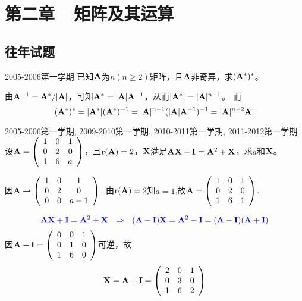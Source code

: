 \section{第二章~~矩阵及其运算}

\subsection{往年试题}
\begin{frame}
\begin{footnotesize}
\begin{exampleblock}{2005-2006第一学期}
已知$\mathbf{A}$为$n(n\ge 2)$矩阵，且$\mathbf{A}$非奇异，求$(\mathbf{A}^*)^*$。
\end{exampleblock}
\pause\jiename
由$\mathbf{A}^{-1}=\mathbf{A}^*/|\mathbf{A}|$，可知$\mathbf{A}^*=|\mathbf{A}|\mathbf{A}^{-1}$，从而$|\mathbf{A}^*|=|\mathbf{A}|^{n-1}$。
而
$$
(\mathbf{A}^*)^*=|\mathbf{A}^*|(\mathbf{A}^*)^{-1}=|\mathbf{A}|^{n-1}(|\mathbf{A}|\mathbf{A}^{-1})^{-1}=|\mathbf{A}|^{n-2}\mathbf{A}.
$$
\end{footnotesize}
\end{frame}

\begin{frame}
\begin{footnotesize}
\begin{exampleblock}{2005-2006第一学期, 2009-2010第一学期, 2010-2011第一学期, 2011-2012第一学期}
设$\mathbf{A}=\left(
\begin{array}{rrr}
1&0&1\\
0&2&0\\
1&6&a
\end{array}
\right)$，且$\mathrm{r}(\mathbf{A})=2$，$\mathbf{X}$满足$\mathbf{A}\mathbf{X}+\mathbf{I}=\mathbf{A}^2+\mathbf{X}$，求$a$和$\mathbf{X}$。
\end{exampleblock}
\pause\jiename
因$\mathbf{A} \rightarrow \left(
\begin{array}{ccc}
1&0&1\\
0&2&0\\
0&0&a-1
\end{array}
\right)$,
由$\mathrm{r}(\mathbf{A})=2$知$a=1$,故$\mathbf{A}=\left(
\begin{array}{rrr}
1&0&1\\
0&2&0\\
1&6&1
\end{array}
\right)$.
\vspace{0.1in}


$$\textcolor{blue}{
\mathbf{A}\mathbf{X}+\mathbf{I}=\mathbf{A}^2+\mathbf{X} ~~\Rightarrow~~
(\mathbf{A}-\mathbf{I})\mathbf{X}=\mathbf{A}^2-\mathbf{I}=(\mathbf{A}-\mathbf{I})(\mathbf{A}+\mathbf{I})
}
$$
因$
\mathbf{A}-\mathbf{I}=\left(
\begin{array}{rrr}
0&0&1\\
0&1&0\\
1&6&0
\end{array}
\right)
$可逆，故
$$
\mathbf{X}=\mathbf{A}+\mathbf{I}=\left(
\begin{array}{rrr}
2&0&1\\
0&3&0\\
1&6&2
\end{array}
\right)
$$
\end{footnotesize}
\end{frame}

